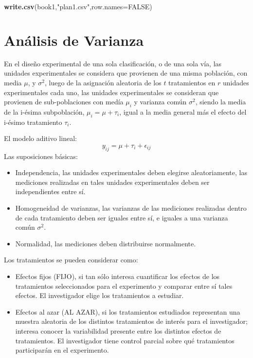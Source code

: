 \documentclass[]{book}
\newenvironment{Shaded}{\begin{snugshade}}{\end{snugshade}}
\newcommand{\KeywordTok}[1]{\textcolor[rgb]{0.13,0.29,0.53}{\textbf{#1}}}
\newcommand{\DataTypeTok}[1]{\textcolor[rgb]{0.13,0.29,0.53}{#1}}
\newcommand{\StringTok}[1]{\textcolor[rgb]{0.31,0.60,0.02}{#1}}
\newcommand{\OtherTok}[1]{\textcolor[rgb]{0.56,0.35,0.01}{#1}}
\newcommand{\NormalTok}[1]{#1}
\begin{document}
\begin{Shaded}
\begin{Highlighting}[]
\KeywordTok{write.csv}\NormalTok{(book1,}\StringTok{"plan1.csv"}\NormalTok{,}\DataTypeTok{row.names=}\OtherTok{FALSE}\NormalTok{)}
\end{Highlighting}
\end{Shaded}

\section{Análisis de Varianza}\label{analisis-de-varianza}

En el diseño experimental de una sola clasificación, o de una sola vía,
las unidades experimentales se considera que provienen de una misma
población, con media \(\mu\), y \(\sigma^2\), luego de la asignación
aleatoria de los \(t\) tratamientos en \(r\) unidades experimentales
cada uno, las unidades experimentales se consideran que provienen de
sub-poblaciones con medía \(\mu_i\) y varianza común \(\sigma^2\),
siendo la media de la i-ésima subpoblación, \(\mu_i=\mu +\tau_i\), igual
a la media general más el efecto del i-ésimo tratamiento \(\tau_i\).

El modelo aditivo lineal: \[y_{ij}=\mu + \tau_i+\epsilon_{ij}\] Las
suposiciones básicas:

\begin{itemize}
\item
  Independencia, las unidades experimentales deben elegirse
  aleatoriamente, las mediciones realizadas en tales unidades
  experimentales deben ser independientes entre sí.
\item
  Homogeneidad de varianzas, las varianzas de las mediciones realizadas
  dentro de cada tratamiento deben ser iguales entre sí, e iguales a una
  varianza común \(\sigma^2\).
\item
  Normalidad, las mediciones deben distribuirse normalmente.
\end{itemize}

Los tratamientos se pueden considerar como:

\begin{itemize}
\item
  Efectos fijos (FIJO), si tan sólo interesa cuantificar los efectos de
  los tratamientos seleccionados para el experimento y comparar entre sí
  tales efectos. El investigador elige los tratamientos a estudiar.
\item
  Efectos al azar (AL AZAR), si los tratamientos estudiados representan
  una muestra aleatoria de los distintos tratamientos de interés para el
  investigador; interesa conocer la variabilidad presente entre los
  distintos efectos de tratamientos. El investigador tiene control
  parcial sobre qué tratamientos participarán en el experimento.
\end{itemize}
\end{document}
